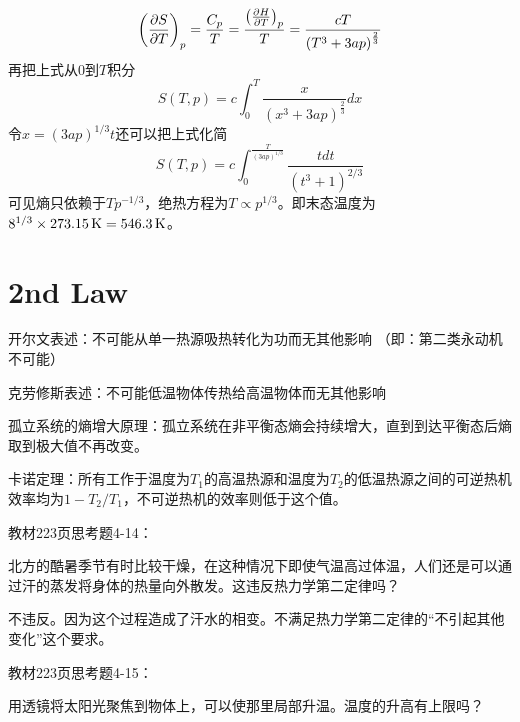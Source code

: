 \documentclass[CJK]{beamer}
\begin{document}
\begin{frame}
  \bch
  {\small
    $$ \left(\frac{\partial S}{\partial T}\right)_{p} = \frac{C_p}{T}= \frac{\left(\frac{\partial H}{\partial T}\right)_{p}}{T}  = \frac{cT}{\left(T^3 +3ap \right)^{\frac{2}{3}}} $$
    再把上式从$0$到$T$积分
    $$ S(T, p) = c \int_0^T  \frac{x}{\left(x^3 +3ap \right)^{\frac{2}{3}}} dx$$
    令$x = (3ap)^{1/3}t$还可以把上式化简
    $$S(T, p) = c \int_0^{\frac{T}{(3ap)^{1/3}}} \frac{tdt}{\left(t^3+1\right)^{2/3}} $$
    可见熵只依赖于$Tp^{-1/3}$，绝热方程为$T\propto p^{1/3}$。即末态温度为$8^{1/3}\times 273.15\,\mathrm{K} = 546.3\,\mathrm{K}$。
}
  \ech
\end{frame}



\section{2nd Law}
\setcounter{chap}{7}
\setcounter{problem}{0}

\begin{frame}
  \bch
\bitem
\item{开尔文表述：不可能从单一热源吸热转化为功而无其他影响 （即：第二类永动机不可能）}
\item{克劳修斯表述：不可能低温物体传热给高温物体而无其他影响}
\item{孤立系统的熵增大原理：孤立系统在非平衡态熵会持续增大，直到到达平衡态后熵取到极大值不再改变。}
\item{卡诺定理：所有工作于温度为$T_1$的高温热源和温度为$T_2$的低温热源之间的可逆热机效率均为$1-T_2/T_1$，不可逆热机的效率则低于这个值。}
  \eitem
\ech
\end{frame}

\begin{frame}
  \chtitle{\proid (\stwo)}
  \bch
  教材223页思考题4-14：

  北方的酷暑季节有时比较干燥，在这种情况下即使气温高过体温，人们还是可以通过汗的蒸发将身体的热量向外散发。这违反热力学第二定律吗？
  \ech
\end{frame}


\begin{frame}
  \bch
  不违反。因为这个过程造成了汗水的相变。不满足热力学第二定律的“不引起其他变化”这个要求。
  \ech
\end{frame}


\begin{frame}
  \chtitle{\proid (\stwo)}
  \bch
  教材223页思考题4-15：

  用透镜将太阳光聚焦到物体上，可以使那里局部升温。温度的升高有上限吗？
  \ech
\end{frame}
\end{document}
